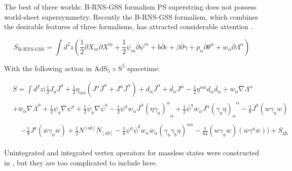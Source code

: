 \documentclass{beamer}
\begin{document}
\begin{frame}{The best of three worlds: B-RNS-GSS formalism}
	PS superstring does not possess world-sheet supersymmetry. Recently the B-RNS-GSS formalism, which combines the desirable features of three formalisms, has attracted considerable attention \cite{Berkovits:2021xwh}.
	\begin{footnotesize}
		\begin{equation*}
			S_{\text{B-RNS-GSS}}=\int d^2z\left(\frac{1}{2}\partial X_m\overline{\partial}X^m+\frac{1}{2}\psi_m\overline{\partial}\psi^m+b\overline{\partial}c+\beta\overline{\partial}\gamma+p_\alpha\overline{\partial}\theta^\alpha+w_\alpha\overline{\partial}\Lambda^\alpha\right)
		\end{equation*}
	\end{footnotesize}
	With the following action in $\text{AdS}_5\times\text{S}^5$ spacetime: \cite{Chandia:2023eel}
	\begin{footnotesize}
		\begin{equation*}
			\begin{aligned}
			&S=\int d^{2}z \Bigg(\frac{1}{2}J_{\underline{a}}\overline{J}^{\underline{a}}+\frac{1}{2}\eta_{\alpha\overline{\alpha}}(J^{\alpha}\overline{J}^{\overline{\alpha}}+J^{\overline{\alpha}}\overline{J}^{\alpha})+d_{\alpha}\overline{J}^{\alpha}+\overline{d}_{\overline{\alpha}}J^{\overline{\alpha}}-\frac{1}{2}\eta^{\alpha\overline{\alpha}}d_{\alpha}\overline{d}_{\overline{\alpha}}+w_{\alpha}\overline{\nabla}\Lambda^{\alpha}\\
			&+\overline{w}_{\overline{\alpha}}\nabla\overline{\Lambda}^{\overline{\alpha}}+ \frac{1}{2}\psi_{\underline{a}}\overline{\nabla}\psi^{\underline{a}}+\frac{1}{2}\overline{\psi}_{\underline{a}}\nabla\overline{\psi}^{\underline{a}}-\frac{1}{2}\psi^{\underline{a}}w_{\alpha}\overline{J}^{\overline{\alpha}}{(\eta\gamma_{\underline{a}})^{\alpha}}_{\overline\alpha}+\frac{1}{2}\overline{\psi}^{\underline{a}}\overline{w}_{\overline{\alpha}}J^{\alpha}{(\gamma_{\underline{a}}\eta)_{\alpha}}^{\overline{\alpha}}-\frac{1}{8}\overline{J}^{\underline{a}}(w\gamma_{\underline{a}}w)\\&\begin{aligned}&- \frac{1}{8}J^{\underline{a}}(\overline{w}\gamma_{\underline{a}}\overline{w})+\frac{1}{2}N^{\left[\underline{ab}\right]}\overline{N}_{\left[\underline{ab}\right]}-\frac{1}{8}\psi^{\underline{a}}\overline{\psi}^{\underline{b}}w_{\alpha}\overline{w}_{\overline{\alpha}}(\gamma_{\underline{a}}\gamma_{\underline{b}}\eta)^{\alpha\overline{\alpha}}-\frac{1}{64}(w\gamma_{\underline{a}}w)(\overline{w}\gamma^{\underline{a}}\overline{w})\Bigg)+S_{\text{gh}}\end{aligned}\end{aligned}
		\end{equation*}
	\end{footnotesize}
	Unintegrated and integrated vertex operators for massless states were constructed in \cite{Chandia:2025nxx}, but they are too complicated to include here.
\end{frame}
\end{document}
